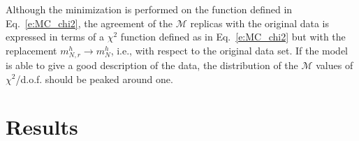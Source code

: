 \documentclass[aps,preprintnumbers,showpacs,nofootinbib,superscriptaddress,floatfix]{revtex4}
\begin{document}
Although the minimization is performed on the function defined in
Eq.~\eqref{e:MC_chi2}, the agreement of the $\mathcal{M}$ replicas with the
original data is expressed in terms of a $\chi^2$ function defined as in
Eq.~\eqref{e:MC_chi2} but with the replacement $m_{N, r}^{h} \to m_{N}^{h}$,
i.e.,  with respect to the original data set. If the model is able to give a
good description of the data, the distribution of the $\mathcal{M}$ values of
$\chi^2$/d.o.f. should be peaked around one.  














\section{Results}
\label{s:results}
\end{document}
